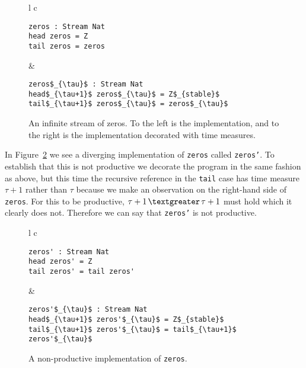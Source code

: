 \begin{figure}
\begin{tabular}{l c}

\begin{minipage}{3in}
\begin{Verbatim}[commandchars=\\\{\},codes={\catcode`$=3\catcode`_=8}]
zeros : Stream Nat
head zeros = Z
tail zeros = zeros
\end{Verbatim}
\end{minipage} &
\begin{minipage}{3in}
\begin{Verbatim}[commandchars=\\\{\},codes={\catcode`$=3\catcode`_=8}]
zeros$_{\tau}$ : Stream Nat
head$_{\tau+1}$ zeros$_{\tau}$ = Z$_{stable}$
tail$_{\tau+1}$ zeros$_{\tau}$ = zeros$_{\tau}$
\end{Verbatim}
\end{minipage}

\end{tabular}
\caption{An infinite stream of zeros. To the left is the implementation, and to the right is the implementation decorated with time measures.}
\label{fig:zeros}
\end{figure}

In Figure~\ref{fig:zerosprime} we see a diverging implementation of \texttt{zeros} called \texttt{zeros'}. To establish that this is not productive we decorate the program in the same fashion as above, but this time the recursive reference in the \texttt{tail} case has time measure $\tau+1$ rather than $\tau$ because we make an observation on the right-hand side of \texttt{zeros}. For this to be productive, $\tau+1\,\textgreater\,\tau+1$ must hold which it clearly does not. Therefore we can say that \texttt{zeros'} is not productive.

\begin{figure}
\begin{tabular}{l c}

\begin{minipage}{3in}
\begin{Verbatim}[commandchars=\\\{\},codes={\catcode`$=3\catcode`_=8}]
zeros' : Stream Nat
head zeros' = Z
tail zeros' = tail zeros'
\end{Verbatim}
\end{minipage} &
\begin{minipage}{3in}
\begin{Verbatim}[commandchars=\\\{\},codes={\catcode`$=3\catcode`_=8}]
zeros'$_{\tau}$ : Stream Nat
head$_{\tau+1}$ zeros'$_{\tau}$ = Z$_{stable}$
tail$_{\tau+1}$ zeros'$_{\tau}$ = tail$_{\tau+1}$ zeros'$_{\tau}$
\end{Verbatim}
\end{minipage}

\end{tabular}
\caption{A non-productive implementation of \texttt{zeros}.}
\label{fig:zerosprime}
\end{figure}

